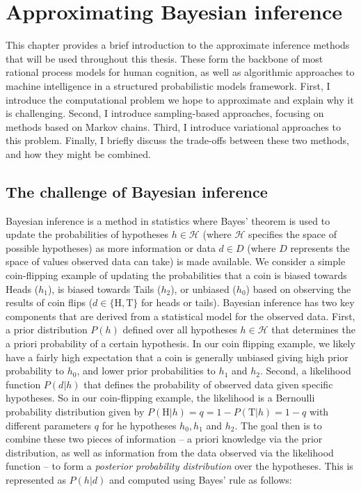 
\chapter{Approximating Bayesian inference}
\label{chap:approx}

This chapter provides a brief introduction to the approximate inference methods that will be used throughout this thesis. These form the backbone of most rational process models for human cognition, as well as algorithmic approaches to machine intelligence in a structured probabilistic models framework. First, I introduce the computational problem we hope to approximate and explain why it is challenging. Second, I introduce sampling-based approaches, focusing on methods based on Markov chains. Third, I introduce variational approaches to this problem. Finally, I briefly discuss the trade-offs between these two methods, and how they might be combined.

\section{The challenge of Bayesian inference}
Bayesian inference is a method in statistics where Bayes' theorem is used to update the probabilities of hypotheses $h \in \mathcal{H}$ (where $\mathcal{H}$ specifies the space of possible hypotheses) as more information or data $d \in D$ (where $D$ represents the space of values observed data can take) is made available. We consider a simple coin-flipping example of updating the probabilities that a coin is biased towards Heads ($h_1$), is biased towards Tails ($h_2$), or unbiased ($h_0$) based on observing the results of coin flips ($d \in \{\text{H}, \text{T}\}$ for heads or tails). Bayesian inference has two key components that are derived from a statistical model for the observed data. First, a prior distribution $P(h)$ defined over all hypotheses $h \in \mathcal{H}$ that determines the a priori probability of a certain hypothesis. In our coin flipping example, we likely have a fairly high expectation that a coin is generally unbiased giving high prior probability to $h_0$, and lower prior probabilities to $h_1$ and $h_2$. Second, a likelihood function $P(d | h)$ that defines the probability of observed data given specific hypotheses. So in our coin-flipping example, the likelihood is a Bernoulli probability distribution given by $P(\text{H} | h) = q = 1 - P(\text{T} | h) = 1- q$ with different parameters $q$ for he hypotheses $h_0, h_1$ and $h_2$. The goal then is to combine these two pieces of information -- a priori knowledge via the prior distribution, as well as information from the data observed via the likelihood function -- to form a \textit{posterior probability distribution} over the hypotheses. This is represented as $P(h | d)$ and computed using Bayes' rule as follows:

